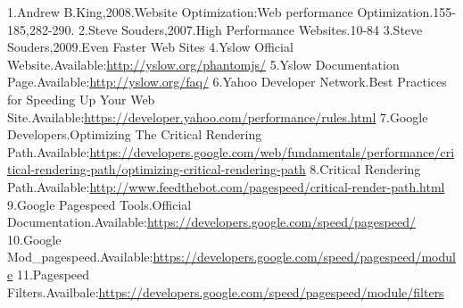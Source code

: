 \documentclass[11pt]{article}
\begin{document}
 1.Andrew B.King,2008.Website Optimization:Web performance Optimization.155-185,282-290.
 2.Steve Souders,2007.High Performance Websites.10-84
 3.Steve Souders,2009.Even Faster Web Sites 
 4.Yslow Official Website.Available:\href{http://yslow.org/phantomjs/}{http://yslow.org/phantomjs/}
 5.Yslow Documentation Page.Available:\href{http://yslow.org/faq/}{http://yslow.org/faq/}
 6.Yahoo Developer Network.Best Practices for Speeding Up Your Web Site.Available:\href{https://developer.yahoo.com/performance/rules.html}{https://developer.yahoo.com/performance/rules.html}
 7.Google Developers.Optimizing The Critical Rendering Path.Available:\href{https://developers.google.com/web/fundamentals/performance/critical-rendering-path/optimizing-critical-rendering-path}{https://developers.google.com/web/fundamentals/performance/critical-rendering-path/optimizing-critical-rendering-path}
 8.Critical Rendering Path.Available:\href{http://www.feedthebot.com/pagespeed/critical-render-path.html}{http://www.feedthebot.com/pagespeed/critical-render-path.html}
 9.Google Pagespeed Tools.Official Documentation.Available:\href{https://developers.google.com/speed/pagespeed/}{https://developers.google.com/speed/pagespeed/}
 10.Google Mod\_pagespeed.Available:\href{https://developers.google.com/speed/pagespeed/module}{https://developers.google.com/speed/pagespeed/module}
 11.Pagespeed Filters.Availbale:\href{https://developers.google.com/speed/pagespeed/module/filters}{https://developers.google.com/speed/pagespeed/module/filters}
   
\end{document}
